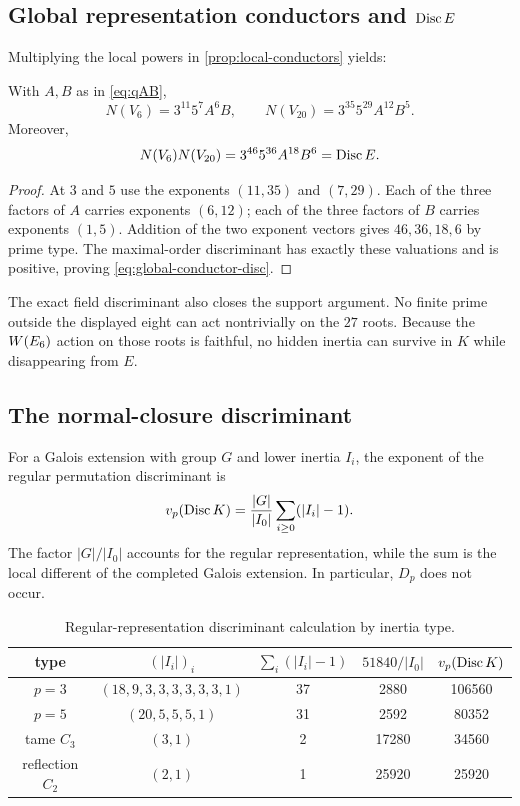 \subsection{\texorpdfstring{Global representation conductors and \(\operatorname{Disc} E\)}{Global representation conductors and the line-field discriminant}}

Multiplying the local powers in \cref{prop:local-conductors} yields:
\begin{corollary}
\label{cor:global-conductors}
With $A,B$ as in \cref{eq:qAB},
\[
 N(V_6)=3^{11}5^7A^6B,\qquad
 N(V_{20})=3^{35}5^{29}A^{12}B^5.
\]
Moreover,
\begin{equation}
 N(V_6)N(V_{20})
 =3^{46}5^{36}A^{18}B^6
 =\operatorname{Disc} E.
\label{eq:global-conductor-disc}
\end{equation}
\end{corollary}

\begin{proof}
At $3$ and $5$ use the exponents $(11,35)$ and $(7,29)$.  Each of the three
factors of $A$ carries exponents $(6,12)$; each of the three factors of $B$
carries exponents $(1,5)$.  Addition of the two exponent vectors gives
$46,36,18,6$ by prime type.  The maximal-order discriminant has exactly
these valuations and is positive, proving \cref{eq:global-conductor-disc}.
\end{proof}

The exact field discriminant also closes the support argument.  No finite
prime outside the displayed eight can act nontrivially on the $27$ roots.
Because the $W(E_6)$ action on those roots is faithful, no hidden inertia can
survive in $K$ while disappearing from $E$.

\subsection{The normal-closure discriminant}

For a Galois extension with group $G$ and lower inertia $I_i$, the exponent
of the regular permutation discriminant is
\begin{equation}
 v_p(\operatorname{Disc} K)=\frac{|G|}{|I_0|}
 \sum_{i\geq0}(|I_i|-1).
\label{eq:regular-disc-formula}
\end{equation}
The factor $|G|/|I_0|$ accounts for the regular representation, while the
sum is the local different of the completed Galois extension.  In particular,
$D_p$ does not occur.

\begin{table}[ht]
\centering
\caption{Regular-representation discriminant calculation by inertia type.}
\label{tab:discK-exponents}
\begin{tabular}{@{}c c c c c@{}}
\toprule
type&$(|I_i|)_i$&$\sum_i(|I_i|-1)$&$51840/|I_0|$&$v_p(\operatorname{Disc} K)$\\
\midrule
$p=3$&$(18,9,3,3,3,3,3,3,1)$&37&2880&106560\\
$p=5$&$(20,5,5,5,1)$&31&2592&80352\\
tame $C_3$&$(3,1)$&2&17280&34560\\
reflection $C_2$&$(2,1)$&1&25920&25920\\
\bottomrule
\end{tabular}
\end{table}


